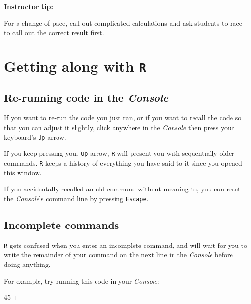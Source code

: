 \documentclass[
]{book}
\newenvironment{Shaded}{\begin{snugshade}}{\end{snugshade}}
\newcommand{\DecValTok}[1]{\textcolor[rgb]{0.00,0.00,0.81}{#1}}
\newcommand{\SpecialCharTok}[1]{\textcolor[rgb]{0.00,0.00,0.00}{#1}}
\begin{document}
\leavevmode{}%
\textbf{Instructor tip:}

For a change of pace, call out complicated calculations and ask students to race to call out the correct result first.

\hypertarget{getting-along-with-r}{%
\section*{\texorpdfstring{Getting along with \texttt{R}}{Getting along with R}}\label{getting-along-with-r}}

\hypertarget{re-running-code-in-the-console}{%
\subsection*{\texorpdfstring{Re-running code in the \emph{Console}}{Re-running code in the Console}}\label{re-running-code-in-the-console}}

If you want to re-run the code you just ran, or if you want to recall the code so that you can adjust it slightly, click anywhere in the \emph{Console} then press your keyboard's \texttt{Up} arrow.

If you keep pressing your \texttt{Up} arrow, \texttt{R} will present you with sequentially older commands. \texttt{R} keeps a history of everything you have said to it since you opened this window.

If you accidentally recalled an old command without meaning to, you can reset the \emph{Console}'s command line by pressing \texttt{Escape}.

\hypertarget{incomplete-commands}{%
\subsection*{Incomplete commands}\label{incomplete-commands}}

\texttt{R} gets confused when you enter an incomplete command, and will wait for you to write the remainder of your command on the next line in the \emph{Console} before doing anything.

For example, try running this code in your \emph{Console}:

\begin{Shaded}
\begin{Highlighting}[]
\DecValTok{45} \SpecialCharTok{+}
\end{Highlighting}
\end{Shaded}
\end{document}
